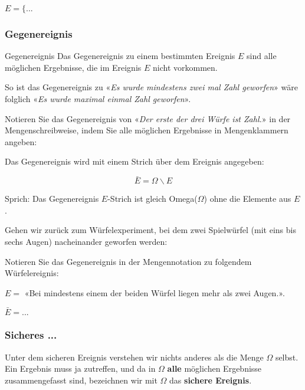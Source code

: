 $E = \{ ...$

\newpage
\subsubsection{Gegenereignis}
\begin{definition}{Gegenereignis}{}
  Das Gegenereignis zu einem bestimmten Ereignis $E$ sind alle möglichen Ergebnisse,
  die im Ereignis $E$ nicht vorkommen.
\end{definition}

So ist das Gegenereignis zu «\textit{Es wurde mindestens zwei mal Zahl
geworfen}» wäre folglich «\textit{Es wurde maximal einmal Zahl
  geworfen}».

Notieren Sie das Gegenereignis von «\textit{Der erste der drei Würfe
  ist Zahl.}» in der Mengenschreibweise, indem Sie alle
möglichen Ergebnisse in Mengenklammern angeben:



\begin{definition}{}{}
Das Gegenereignis wird mit einem Strich über dem Ereignis angegeben:

$$\bar{E} = \Omega \backslash E$$
\end{definition}

Sprich: Das Gegenereignis $E$-Strich ist gleich Omega($\Omega$) ohne die Elemente
aus $E$.

Gehen wir zurück zum Würfelexperiment, bei dem zwei Spielwürfel (mit
eins bis sechs Augen) nacheinander geworfen werden:

Notieren Sie das Gegenereignis in der Mengennotation zu folgendem
Würfelereignis:

$E=$ «Bei mindestens einem der beiden Würfel liegen
mehr als zwei Augen.».

$\bar{E} = ...$

\newpage

\subsubsection{Sicheres ...}
Unter dem sicheren Ereignis verstehen wir nichts anderes als die Menge
$\Omega$ selbst. Ein Ergebnis muss ja zutreffen, und da in $\Omega$
\textbf{alle} möglichen Ergebnisse zusammengefasst sind, bezeichnen
wir mit $\Omega$ das \textbf{sichere Ereignis}.

